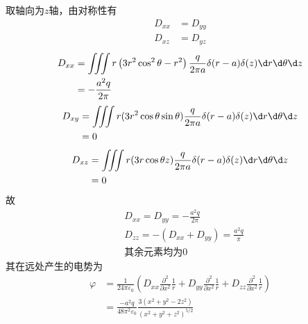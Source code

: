 \documentclass{phyasgn}
\begin{document}
\begin{sol}[2]
    取轴向为$z$轴，由对称性有
    \begin{align*}
        D_{xx}&=D_{yy}\\
        D_{xz}&=D_{yz}
    \end{align*}
    \begin{align*}
        D_{xx}&=\iiint r\left(3r^2\cos^2\theta-r^2\right)\frac{q}{2\pi a}\delta(r-a)\delta(z)\d r\d \theta\d z\\
        &=-\frac{a^2q}{2\pi}
    \end{align*}
    \begin{align*}
        D_{xy}&=\iiint r(3r^2\cos\theta\sin\theta)\frac{q}{2\pi a}\delta(r-a)\delta(z)\d r\d \theta\d z\\
        &=0
    \end{align*}
    \begin{align*}
        D_{xz}&=\iiint r(3r\cos\theta z)\frac{q}{2\pi a}\delta(r-a)\delta(z)\d r\d \theta\d z\\
        &=0
    \end{align*}
    故
    \begin{align*}
        &D_{xx}=D_{yy}=-\frac{a^2q}{2\pi}\\
        &D_{zz}=-(D_{xx}+D_{yy})=\frac{a^2q}{\pi}\\
        &\text{其余元素均为0}
    \end{align*}
    其在远处产生的电势为
    \begin{align*}
        \varphi&=\frac{1}{24\pi\varepsilon_0}\left(D_{xx}\frac{\partial^2}{\partial x^2}\frac{1}{r}+D_{yy}\frac{\partial^2}{\partial x^2}\frac{1}{r}+D_{zz}\frac{\partial^2}{\partial x^2}\frac{1}{r}\right)\\
        &=\frac{-a^2q}{48\pi^2\varepsilon_0}\frac{3 \left(x^2+y^2-2 z^2\right)}{\left(x^2+y^2+z^2\right)^{5/2}}
    \end{align*}
\end{sol}
\end{document}
